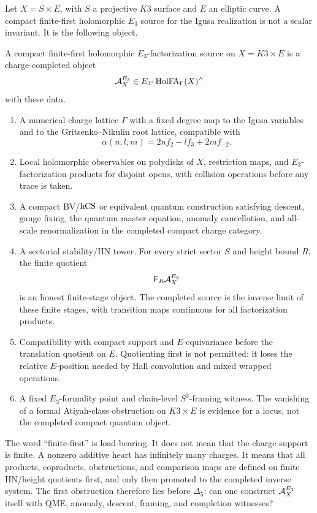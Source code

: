 Let \(X=S\times E\), with \(S\) a projective \(K3\) surface and \(E\) an
elliptic curve.  A compact finite-first holomorphic \(E_3\) source for the
Igusa realization is not a scalar invariant.  It is the following object.

\begin{definition}
A compact finite-first holomorphic \(E_3\)-factorization source on
\(X=K3\times E\) is a charge-completed object
\[
        \mathcal A^{E_3}_X\in E_3\text{-}\operatorname{HolFA}_\Gamma(X)^\wedge
\]
with these data.
\begin{enumerate}
\item A numerical charge lattice \(\Gamma\) with a fixed degree map to the
Igusa variables and to the Gritsenko--Nikulin root lattice, compatible
with
\[
        \alpha(n,l,m)=2nf_2-lf_3+2mf_{-2}.
\]
\item Local holomorphic observables on polydisks of \(X\), restriction maps,
and \(E_3\)-factorization products for disjoint opens, with collision
operations before any trace is taken.
\item A compact BV/\(\operatorname{hCS}\) or equivalent quantum construction satisfying
descent, gauge fixing, the quantum master equation, anomaly cancellation,
and all-scale renormalization in the completed compact charge category.
\item A sectorial stability/HN tower.  For every strict sector \(S\) and
height bound \(R\), the finite quotient
\[
        \mathsf F_R\mathcal A^{E_3}_X
\]
is an honest finite-stage object.  The completed source is the inverse
limit of these finite stages, with transition maps continuous for all
factorization products.
\item Compatibility with compact support and \(E\)-equivariance before the
translation quotient on \(E\).  Quotienting first is not permitted: it loses
the relative \(E\)-position needed by Hall convolution and mixed wrapped
operations.
\item A fixed \(E_3\)-formality point and chain-level \(S^3\)-framing
witness.  The vanishing of a formal Atiyah-class obstruction on
\(K3\times E\) is evidence for a locus, not the completed compact quantum
object.
\end{enumerate}
\end{definition}

The word ``finite-first'' is load-bearing.  It does not mean that the
charge support is finite.  A nonzero additive heart has infinitely many
charges.  It means that all products, coproducts, obstructions, and
comparison maps are defined on finite HN/height quotients first, and only
then promoted to the completed inverse system.  The first obstruction
therefore lies before \(\Delta_5\): can one construct \(\mathcal A^{E_3}_X\) itself with
QME, anomaly, descent, framing, and completion witnesses?

